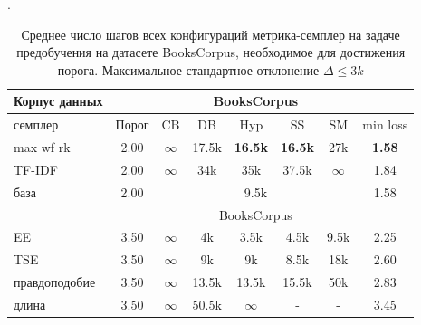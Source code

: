 \documentclass{spbau-diploma}
\begin{document}
\begin{table}
	\caption{Среднее число шагов всех конфигураций метрика-семплер на задаче предобучения на датасете BooksCorpus, необходимое для достижения порога. Максимальное стандартное отклонение $\Delta \le 3k$}.		\label{table:BooksCorpus_pretraining}
	\centering
	\begin{tabular}{l|c|ccccc|c}
		Корпус данных & & \multicolumn{5}{c}{BooksCorpus} &\\
		\hline
		семплер & Порог & CB & DB & Hyp & SS & SM & min loss\\
		\hline
		max wf rk & 2.00 & $\infty$ & 17.5k & {\bf 16.5k} & {\bf 16.5k} & 27k & {\bf 1.58} \\
		TF-IDF & 2.00 & $\infty$ & 34k & 35k & 37.5k & $\infty$ & 1.84 \\
		\hline
		база & 2.00 & \multicolumn{5}{c}{9.5k} & 1.58 \\
		\hline
		\hline
		& & \multicolumn{5}{c}{BooksCorpus} & \\
		\hline
		EE & 3.50 & $\infty$ & 4k & 3.5k & 4.5k & 9.5k & 2.25 \\
		TSE & 3.50 & $\infty$ & 9k & 9k & 8.5k & 18k & 2.60 \\
		правдоподобие & 3.50 & $\infty$ & 13.5k & 13.5k & 15.5k & 50k & 2.83 \\
		длина & 3.50 & $\infty$ & 50.5k & $\infty$ & - & - & 3.45 \\
		\hline
	\end{tabular}
\end{table}
\end{document}
